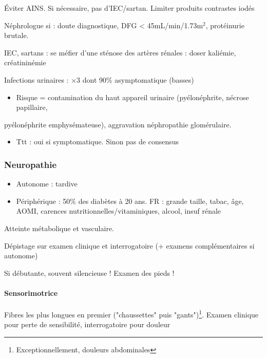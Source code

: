 \documentclass[11pt]{article}
\begin{document}
Éviter AINS. Si nécessaire, pas d'IEC/sartan. Limiter produits contrastes iodés

Néphrologue si : doute diagnostique, DFG < 45mL/min/1.73m\(^{\text{2}}\), protéinurie brutale.

IEC, sartans : se méfier d'une sténose des artères rénales : doser kaliémie, créatininémie

Infections urinaires : \(\times 3\) dont 90\% asymptomatique (basses)
\begin{itemize}
\item Risque = contamination du haut appareil urinaire (pyélonéphrite, nécrose papillaire,
\end{itemize}
pyélonéphrite emphysémateuse), aggravation néphropathie glomérulaire.
\begin{itemize}
\item Ttt : oui si symptomatique. Sinon pas de consensus
\end{itemize}

\subsubsection{Neuropathie}
\label{sec:org1b49ee2}
\begin{itemize}
\item Autonome : tardive
\item Périphérique : 50\% des diabètes à 20 ans. FR : grande taille, tabac, âge,
AOMI, carences nutritionnelles/vitaminiques, alcool, insuf rénale
\end{itemize}

Atteinte métabolique et vasculaire.

Dépistage sur examen clinique et interrogatoire (+ examens complémentaires si
autonome)

Si débutante, souvent silencieuse ! Examen des pieds !

\paragraph{Sensorimotrice}
\label{sec:org6884942}
Fibres les plus longues en premier ("chaussettes" puis "gants")\footnote{Exceptionnellement, douleurs abdominales}. Examen
clinique pour perte de sensibilité, interrogatoire pour douleur
\end{document}
